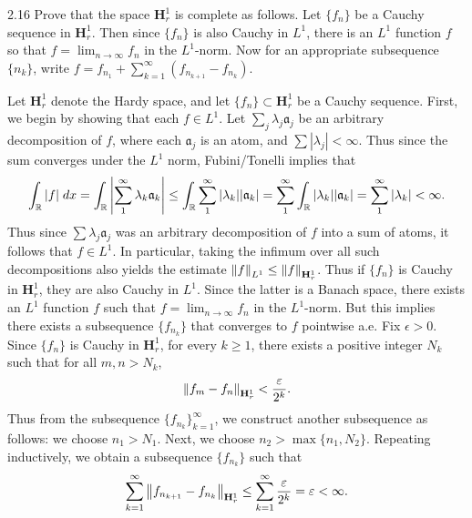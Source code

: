 \documentclass{article}
\begin{document}
\begin{prb}{2.16}
	Prove that the space $\mathbf{H}^{1}_{r}$ is complete as follows. Let $\{f_{n}\}$ be a Cauchy sequence in $\mathbf{H}^{1}_{r}$. Then since $\{f_{n}\}$ is also Cauchy in $L^{1}$, there is an $L^{1}$ function $f$ so that $f = \lim_{n \to \infty}f_{n}$ in the $L^{1}$-norm. Now for an appropriate subsequence $\{n_{k}\}$, write $f = f_{n_{1}} + \sum_{k = 1}^{\infty}(f_{n_{k + 1}} - f_{n_{k}})$. 
\end{prb}
Let $\mathbf{H}^{1}_{r}$ denote the Hardy space, and let $\{f_{n}\} \subset \mathbf{H}^{1}_{r}$ be a Cauchy sequence. First, we begin by showing that each $f \in L^{1}$. Let $\sum_{j}\lambda_{j}\mathfrak{a}_{j}$ be an arbitrary decomposition of $f$, where each $\mathfrak{a}_{j}$ is an atom, and $\sum |\lambda_{j}| < \infty$. Thus since the sum converges under the $L^{1}$ norm, Fubini/Tonelli implies that 
\begin{equation*}
	\int_{\mathbb{R}}|f|\;dx = \int_{\mathbb{R}}\left| \sum_{1}^{\infty}\lambda_{k}\mathfrak{a}_{k} \right| \leq \int_{\mathbb{R}}\sum_{1}^{\infty}|\lambda_{k}||\mathfrak{a}_{k}|= \sum_{1}^{\infty}\int_{\mathbb{R}}|\lambda_{k}||\mathfrak{a}_{k}| = \sum_{1}^{\infty}|\lambda_{k}| < \infty.  
\end{equation*}
Thus since $\sum \lambda_{j}\mathfrak{a}_{j}$ was an arbitrary decomposition of $f$ into a sum of atoms, it follows that $f \in L^{1}$. In particular, taking the infimum over all such decompositions also yields the estimate $\left\Vert f \right\Vert_{L^{1}} \leq \left\Vert f \right\Vert_{\mathbf{H}^{1}_{r}}$. Thus if $\{f_{n}\}$ is Cauchy in $\mathbf{H}^{1}_{r}$, they are also Cauchy in $L^{1}$. Since the latter is a Banach space, there exists an $L^{1}$ function $f$ such that $f = \lim_{n\to \infty} f_{n}$ in the $L^{1}$-norm. But this implies there exists a subsequence $\{f_{n_{k}}\}$ that converges to $f$ pointwise a.e. Fix $\epsilon > 0$. Since $\{f_{n}\}$ is Cauchy in $\mathbf{H}^{1}_{r}$, for every $k \geq 1$, there exists a positive integer $N_{k}$ such that for all $m, n > N_{k}$, 
\begin{equation*}
	\left\Vert f_{m} - f_{n} \right\Vert_{\mathbf{H}^{1}_{r}} < \frac{\varepsilon}{2^{k}}. 
\end{equation*} 
Thus from the subsequence $\{f_{n_{k}}\}_{k = 1}^{\infty}$, we construct another subsequence as follows: we choose $n_{1} > N_{1}$. Next, we choose $n_{2} > \max\{n_{1}, N_{2}\}$. Repeating inductively, we obtain a subsequence $\{f_{n_{k}}\}$ such that 
\begin{equation*}
	\sum_{k = 1}^{\infty}\left\Vert f_{n_{k + 1}} - f_{n_{k}} \right\Vert_{\mathbf{H}^{1}_{r}} \leq \sum_{k = 1}^{\infty}\frac{\varepsilon}{2^{k}} = \varepsilon < \infty. 
\end{equation*} 
\end{document}
